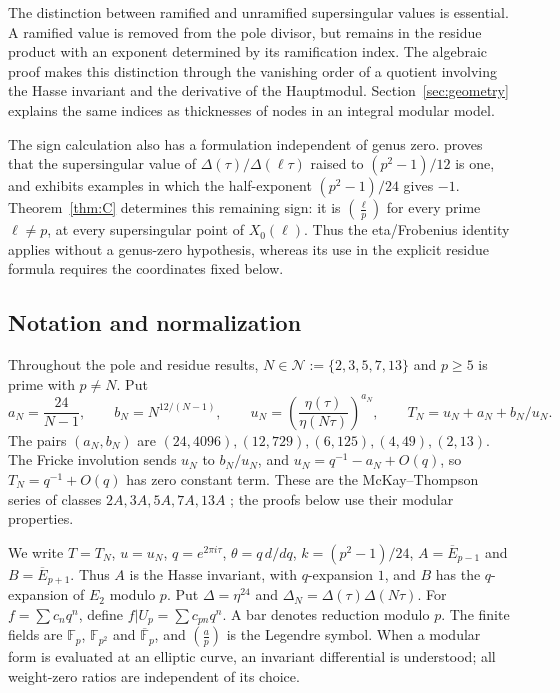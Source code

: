 \documentclass[11pt,a4paper]{article}
\numberwithin{equation}{section}
\theoremstyle{definition}
\theoremstyle{remark}
\newcommand{\Fp}{\mathbb F_p}
\newcommand{\Fq}{\mathbb F_{p^2}}
\newcommand{\Fb}{\overline{\mathbb F}_p}
\begin{document}
The distinction between ramified and unramified supersingular values is essential.
A ramified value is removed from the pole divisor, but remains in the residue
product with an exponent determined by its ramification index. The algebraic proof
makes this distinction through the vanishing order of a quotient involving the Hasse
invariant and the derivative of the Hauptmodul. Section~\ref{sec:geometry} explains
the same indices as thicknesses of nodes in an integral modular model.

The sign calculation also has a formulation independent of genus zero.
\citet[Theorem~1.2 and Remark~4]{Ono25} proves that the supersingular value of
$\Delta(\tau)/\Delta(\ell\tau)$ raised to $(p^2-1)/12$ is one, and exhibits
examples in which the half-exponent $(p^2-1)/24$ gives $-1$.
Theorem~\ref{thm:C} determines this remaining sign: it is
$\left(\frac{\ell}{p}\right)$ for every prime $\ell\ne p$, at every
supersingular point of $X_0(\ell)$. Thus the eta/Frobenius identity applies
without a genus-zero hypothesis, whereas its use in the explicit residue
formula requires the coordinates fixed below.

\subsection{Notation and normalization}
Throughout the pole and residue results,
$N\in\mathcal N:=\{2,3,5,7,13\}$ and $p\ge5$ is prime with $p\ne N$. Put
\[
a_N=\frac{24}{N-1},\qquad b_N=N^{12/(N-1)},\qquad
u_N=\left(\frac{\eta(\tau)}{\eta(N\tau)}\right)^{a_N},\qquad
T_N=u_N+a_N+b_N/u_N.
\]
The pairs $(a_N,b_N)$ are $(24,4096),(12,729),(6,125),(4,49),(2,13)$.
The Fricke involution sends $u_N$ to $b_N/u_N$, and
$u_N=q^{-1}-a_N+O(q)$, so $T_N=q^{-1}+O(q)$ has zero constant term.
These are the McKay--Thompson series of classes $2A,3A,5A,7A,13A$
\citep{CN79}; the proofs below use their modular properties.

We write $T=T_N$, $u=u_N$, $q=e^{2\pi i\tau}$, $\theta=q\,d/dq$,
$k=(p^2-1)/24$, $A=\overline E_{p-1}$ and $B=\overline E_{p+1}$.
Thus $A$ is the Hasse invariant, with $q$-expansion $1$, and $B$ has the
$q$-expansion of $E_2$ modulo $p$. Put
$\Delta=\eta^{24}$ and $\Delta_N=\Delta(\tau)\Delta(N\tau)$.
For $f=\sum c_nq^n$, define $f|U_p=\sum c_{pn}q^n$.
A bar denotes reduction modulo $p$. The finite fields are
$\Fp$, $\Fq$ and $\Fb$, and $\left(\frac{a}{p}\right)$ is the Legendre symbol.
When a modular form is evaluated at an elliptic curve, an invariant differential
is understood; all weight-zero ratios are independent of its choice.
\end{document}
